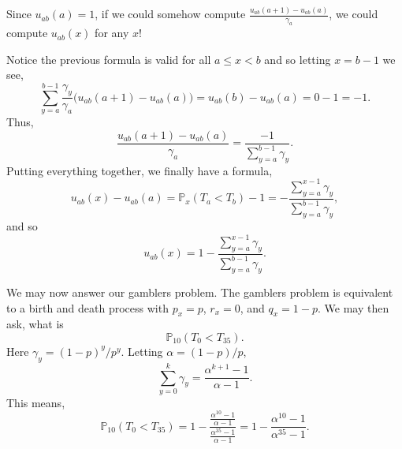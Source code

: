 \documentclass{problemset}
\renewcommand{\P}{\mathbb{P}}
\begin{document}
	Since $u_{ab}(a)=1$, if we could somehow compute $\frac{u_{ab}(a+1)-u_{ab}(a)}{\gamma_a}$, we could compute $u_{ab}(x)$ for any $x$!

	Notice the previous formula is valid for all $a\leq x<b$ and so letting $x=b-1$ we see,
	\[
		\sum_{y=a}^{b-1} \frac{\gamma_y}{\gamma_a}\Big(u_{ab}(a+1)-u_{ab}(a)\Big)
		=u_{ab}(b)-u_{ab}(a) = 0-1=-1.
	\]
	Thus, 
	\[
		\frac{u_{ab}(a+1)-u_{ab}(a)}{\gamma_a} = \frac{-1}{\displaystyle \sum_{y=a}^{b-1} \gamma_y}.
	\]
	Putting everything together, we finally have a formula,
	\[
		u_{ab}(x) - u_{ab}(a) = \P_x(T_a<T_b)-1 = -\frac{\sum_{y=a}^{x-1} \gamma_y}{\sum_{y=a}^{b-1}\gamma_y},
	\]
	and so
	\[
		u_{ab}(x)  = 1-\frac{\sum_{y=a}^{x-1} \gamma_y}{\sum_{y=a}^{b-1}\gamma_y}.
	\]


	\vspace{.5cm}
	We may now answer our gamblers problem.  The gamblers problem is equivalent to a birth and death 
	process with $p_x=p$, $r_x=0$, and $q_x=1-p$.  We may then ask, what is
	\[
		\P_{10}(T_0 < T_{35}).
	\]
	Here $\gamma_y = (1-p)^y/p^y$.  Letting $\alpha = (1-p)/p$,
	\[
		\sum_{y=0}^{k} \gamma_y = \frac{\alpha^{k+1}-1}{\alpha-1}.
	\]
	This means,
	\[
		\P_{10}(T_0 < T_{35}) = 1-\frac{\frac{\alpha^{10}-1}{\alpha-1}}  {\frac{\alpha^{35}-1}{\alpha-1}} = 1-\frac{\alpha^{10}-1}{\alpha^{35}-1}.
	\]
\end{document}
